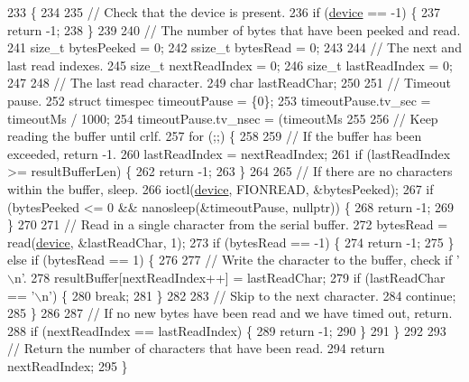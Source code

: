 \begin{DoxyCode}
233 \{
234 
235     \textcolor{comment}{// Check that the device is present.}
236     \textcolor{keywordflow}{if} (\hyperlink{class_u_art_a61fb55cc7c92c85f2219dffcfb58bc12}{device} == -1) \{
237         \textcolor{keywordflow}{return} -1;
238     \}
239 
240     \textcolor{comment}{// The number of bytes that have been peeked and read.}
241     \textcolor{keywordtype}{size\_t} bytesPeeked = 0;
242     ssize\_t bytesRead = 0;
243 
244     \textcolor{comment}{// The next and last read indexes.}
245     \textcolor{keywordtype}{size\_t} nextReadIndex = 0;
246     \textcolor{keywordtype}{size\_t} lastReadIndex = 0;
247 
248     \textcolor{comment}{// The last read character.}
249     \textcolor{keywordtype}{char} lastReadChar;
250 
251     \textcolor{comment}{// Timeout pause.}
252     \textcolor{keyword}{struct }timespec timeoutPause = \{0\};
253     timeoutPause.tv\_sec = timeoutMs / 1000;
254     timeoutPause.tv\_nsec = (timeoutMs %
255 
256     \textcolor{comment}{// Keep reading the buffer until crlf.}
257     \textcolor{keywordflow}{for} (;;) \{
258 
259         \textcolor{comment}{// If the buffer has been exceeded, return -1.}
260         lastReadIndex = nextReadIndex;
261         \textcolor{keywordflow}{if} (lastReadIndex >= resultBufferLen) \{
262             \textcolor{keywordflow}{return} -1;
263         \}
264 
265         \textcolor{comment}{// If there are no characters within the buffer, sleep.}
266         ioctl(\hyperlink{class_u_art_a61fb55cc7c92c85f2219dffcfb58bc12}{device}, FIONREAD, &bytesPeeked);
267         \textcolor{keywordflow}{if} (bytesPeeked <= 0 && nanosleep(&timeoutPause, \textcolor{keyword}{nullptr})) \{
268             \textcolor{keywordflow}{return} -1;
269         \}
270 
271         \textcolor{comment}{// Read in a single character from the serial buffer.}
272         bytesRead = read(\hyperlink{class_u_art_a61fb55cc7c92c85f2219dffcfb58bc12}{device}, &lastReadChar, 1);
273         \textcolor{keywordflow}{if} (bytesRead == -1) \{
274             \textcolor{keywordflow}{return} -1;
275         \} \textcolor{keywordflow}{else} \textcolor{keywordflow}{if} (bytesRead == 1) \{
276 
277             \textcolor{comment}{// Write the character to the buffer, check if '\(\backslash\)n'.}
278             resultBuffer[nextReadIndex++] = lastReadChar;
279             \textcolor{keywordflow}{if} (lastReadChar == \textcolor{charliteral}{'\(\backslash\)n'}) \{
280                 \textcolor{keywordflow}{break};
281             \}
282 
283             \textcolor{comment}{// Skip to the next character.}
284             \textcolor{keywordflow}{continue};
285         \}
286 
287         \textcolor{comment}{// If no new bytes have been read and we have timed out, return.}
288         \textcolor{keywordflow}{if} (nextReadIndex == lastReadIndex) \{
289             \textcolor{keywordflow}{return} -1;
290         \}
291     \}
292 
293     \textcolor{comment}{// Return the number of characters that have been read.}
294     \textcolor{keywordflow}{return} nextReadIndex;
295 \}
\end{DoxyCode}
